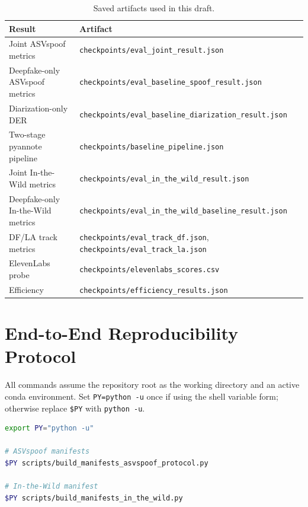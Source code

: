 \documentclass{article}
\newcommand{\der}{DER}
\newcommand{\asv}{ASVspoof}
\newcommand{\itw}{In-the-Wild}
\begin{document}
\begin{table}[h]
  \centering
  \caption{Saved artifacts used in this draft.}
  \label{tab:provenance}
  \small
  \begin{tabular}{ll}
    \toprule
    Result & Artifact \\
    \midrule
    Joint \asv{} metrics & \texttt{checkpoints/eval\_joint\_result.json} \\
    Deepfake-only \asv{} metrics & \texttt{checkpoints/eval\_baseline\_spoof\_result.json} \\
    Diarization-only \der{} & \texttt{checkpoints/eval\_baseline\_diarization\_result.json} \\
    Two-stage pyannote pipeline & \texttt{checkpoints/baseline\_pipeline.json} \\
    Joint \itw{} metrics & \texttt{checkpoints/eval\_in\_the\_wild\_result.json} \\
    Deepfake-only \itw{} metrics & \texttt{checkpoints/eval\_in\_the\_wild\_baseline\_result.json} \\
    DF/LA track metrics & \texttt{checkpoints/eval\_track\_df.json}, \texttt{checkpoints/eval\_track\_la.json} \\
    ElevenLabs probe & \texttt{checkpoints/elevenlabs\_scores.csv} \\
    Efficiency & \texttt{checkpoints/efficiency\_results.json} \\
    \bottomrule
  \end{tabular}
\end{table}

\section{End-to-End Reproducibility Protocol}
\label{app:repro}

All commands assume the repository root as the working directory and an active
conda environment.  Set \texttt{PY=python -u} once if using the shell variable
form; otherwise replace \texttt{\$PY} with \texttt{python -u}.

\begin{lstlisting}[language=bash,caption={Phase 0: build manifests.}]
export PY="python -u"

# ASVspoof manifests
$PY scripts/build_manifests_asvspoof_protocol.py

# In-the-Wild manifest
$PY scripts/build_manifests_in_the_wild.py
\end{lstlisting}
\end{document}
